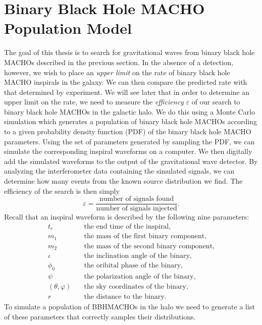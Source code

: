 \section{Binary Black Hole MACHO Population Model}
\label{s:bbhmachopopulation}

The goal of this thesis is to search for gravitational waves from binary black
hole MACHOs described in the previous section. In the absence of a detection,
however, we wish to place an \emph{upper limit} on the rate of binary black
hole MACHO inspirals in the galaxy. We can then compare the predicted rate
with that determined by experiment. We will see later that in order to
determine an upper limit on the rate, we need to measure the \emph{efficiency}
$\varepsilon$ of our search to binary black hole MACHOs in the galactic halo.
We do this using a Monte Carlo simulation which generates a population of
binary black hole MACHOs according to a given probability density function
(PDF) of the binary black hole MACHO parameters. Using the set of parameters
generated by sampling the PDF, we can simulate the corresponding inspiral
waveforms on a computer. We then digitally add the simulated waveforms to the
output of the gravitational wave detector. By analyzing the interferometer
data containing the simulated signals, we can determine how many events from
the known source distribution we find. The efficiency of the
search is then simply
\begin{equation}
\varepsilon = 
\frac{\textrm{number of signals found}}{\textrm{number of signals injected}}.
\end{equation}
Recall that an inspiral waveform is described by the following nine 
parameters:
\begin{equation*}
\begin{split}
t_c &\quad \textrm{the end time of the inspiral}, \\
m_1 &\quad \textrm{the mass of the first binary component}, \\
m_2 &\quad \textrm{the mass of the second binary component}, \\
\iota &\quad \textrm{the inclination angle of the binary}, \\
\phi_0 &\quad \textrm{the oribital phase of the binary}, \\
\psi &\quad \textrm{the polarization angle of the binary}, \\
(\theta,\varphi) &\quad \textrm{the sky coordinates of the binary},\\
r  &\quad \textrm{the distance to the binary}.
\end{split}
\end{equation*}
To simulate a population of BBHMACHOs in the halo we need to generate a list
of these parameters that correctly samples their distributions.


